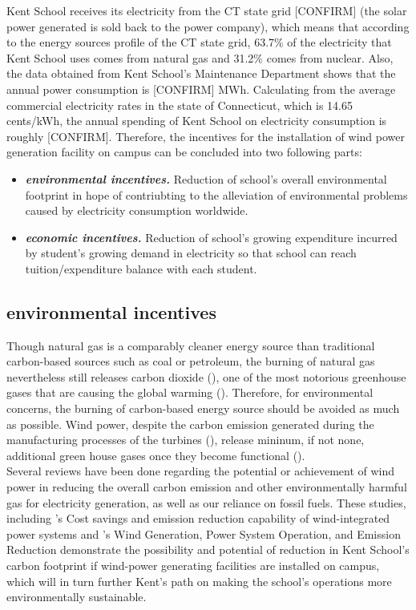 \documentclass[review]{elsarticle}
\begin{document}
Kent School receives its electricity from the CT state grid [CONFIRM] (the solar power generated is sold back to the power company), which means that according to the energy sources profile of the CT state grid, 63.7\% of the electricity that Kent School uses comes from natural gas and 31.2\% comes from nuclear. Also, the data obtained from Kent School’s Maintenance Department shows that the annual power consumption is [CONFIRM] MWh. Calculating from the average commercial electricity rates in the state of Connecticut, which is 14.65 cents/kWh, the annual spending of Kent School on electricity consumption is roughly [CONFIRM]. Therefore, the incentives for the installation of wind power generation facility on campus can be concluded into two following parts:
\begin{itemize}
    \item \textit{\textbf{environmental incentives.}} Reduction of school's overall environmental footprint in hope of contriubting to the alleviation of environmental problems caused by electricity consumption worldwide.
    \item \textit{\textbf{economic incentives.}} Reduction of school's growing expenditure incurred by student's growing demand in electricity so that school can reach tuition/expenditure balance with each student.
\end{itemize}

\subsection{environmental incentives}
Though natural gas is a comparably cleaner energy source than traditional carbon-based sources such as coal or petroleum, the burning of natural gas nevertheless still releases carbon dioxide (\cite{cost_and_performance_baseline_for_fossil_energy_plants}), one of the most notorious greenhouse gases that are causing the global warming (\cite{Shakun2012_co2_global_warming}). Therefore, for environmental concerns, the burning of carbon-based energy source should be avoided as much as possible. Wind power, despite the carbon emission generated during the manufacturing processes of the turbines (\cite{Kaldellis_carbon_foortprint_of_offshore_wind_energy}), release mininum, if not none, additional green house gases once they become functional (\cite{IEEE_wind_carbon_reduction}).
\\\indent Several reviews have been done regarding the potential or achievement of wind power in reducing the overall carbon emission and other environmentally harmful gas for electricity generation, as well as our reliance on fossil fuels. These studies, including \cite{rajat_cost_saving_and_emission_reduction}'s Cost savings and emission reduction capability of wind-integrated power systems and \cite{IEEE_wind_carbon_reduction}'s Wind Generation, Power System Operation, and Emission Reduction demonstrate the possibility and potential of reduction in Kent School’s carbon footprint if wind-power generating facilities are installed on campus, which will in turn further Kent’s path on making the school’s operations more environmentally sustainable.
 
\end{document}
